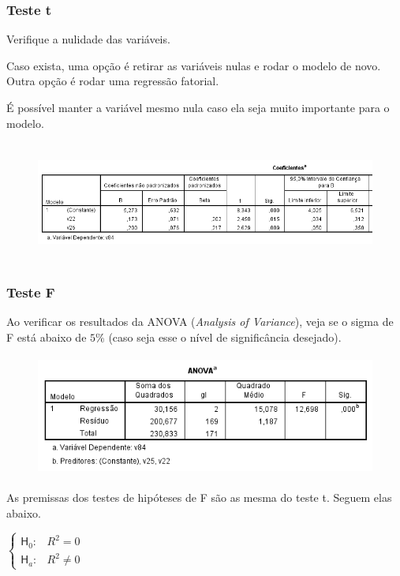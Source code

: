 		\subsubsection{Teste t}

			Verifique a nulidade das variáveis.
			
			Caso exista, uma opção é retirar as variáveis nulas e rodar o modelo de novo. Outra opção é rodar uma regressão fatorial.

			É possível manter a variável mesmo nula caso ela seja muito importante para o modelo. \cite{torres}

			\begin{figure}[H]
				\centering
				\includegraphics[height=4cm]{images/rl_teste-t}
			\end{figure}

		\subsubsection{Teste F}

			Ao verificar os resultados da ANOVA (\emph{Analysis of Variance}), veja se o sigma de F está abaixo de $ 5\% $ (caso seja esse o nível de significância desejado).

			\begin{figure}[H]
				\centering
				\includegraphics[height=4cm]{images/rl_anova}
			\end{figure}

			As premissas dos testes de hipóteses de F são as mesma do teste t. Seguem elas abaixo.

			\bigskip

			$
				\begin{cases}
					\mathsf{H}_{0} : & R^{2} = 0 \\
					\mathsf{H}_{a} : & R^{2} \neq 0
				\end{cases}
			$	

